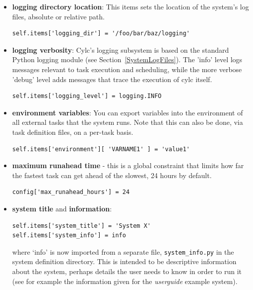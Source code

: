 \documentclass[11pt,a4paper]{article}
\begin{document}
\begin{itemize}
    \item {\bf logging directory location}: 
        This items sets the location of the system's log files, absolute
        or relative path.

        \begin{lstlisting}
self.items['logging_dir'] = '/foo/bar/baz/logging'
        \end{lstlisting}

    \item {\bf logging verbosity}: Cylc's logging subsystem is based on
        the standard Python logging module (see
        Section~\ref{SystemLogFiles}). The 'info' level logs messages
        relevant to task execution and scheduling, while the more
        verbose 'debug' level adds messages that trace the execution of
        cylc itself.

        \begin{lstlisting}
self.items['logging_level'] = logging.INFO
        \end{lstlisting}

    \item {\bf environment variables}: You can export variables into the 
        environment of all external tasks that the system runs. Note that
        this can also be done, via task definition files, on a per-task
        basis.

        \begin{lstlisting}
self.items['environment'][ 'VARNAME1' ] = 'value1'
        \end{lstlisting}

    \item {\bf maximum runahead time} - this is a global constraint that
        limits how far the fastest task can get ahead of the slowest, 24
        hours by default.
        
        \begin{lstlisting}
config['max_runahead_hours'] = 24
        \end{lstlisting}


    \item {\bf system title} and {\bf information}: 

        \begin{lstlisting}
self.items['system_title'] = 'System X'
self.items['system_info'] = info
        \end{lstlisting}
        where `info' is now imported from a separate file, 
        \lstinline=system_info.py= in the system definition directory.
        This is intended to be descriptive information about the system,
        perhaps details the user needs to know in order to run it (see
        for example the information given for the {\em userguide}
        example system).


\end{itemize}
\end{document}
